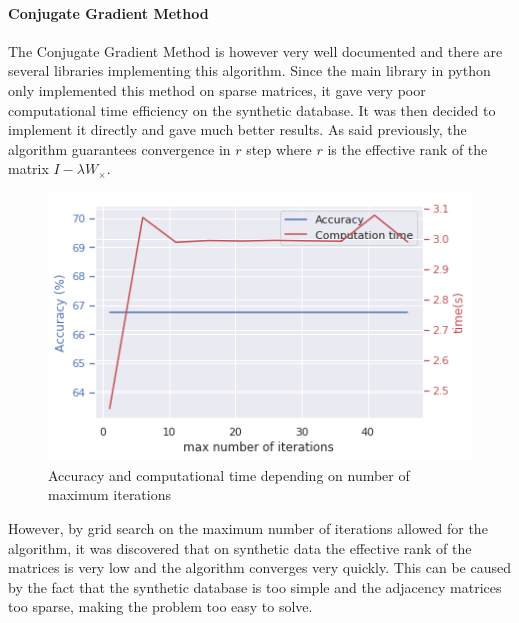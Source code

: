 \documentclass{article}
\theoremstyle{definition}
\begin{document}
\paragraph{Conjugate Gradient Method}
The Conjugate Gradient Method is however very well documented\cite{nesterov_lectures_2018} and there are several libraries implementing this algorithm. Since the main library in python\cite{jones2016scipy} only implemented this method on sparse matrices, it gave very poor computational time efficiency on the synthetic database. It was then decided to implement it directly and gave much better results. As said previously, the algorithm guarantees convergence in $r$ step where $r$ is the effective rank of the matrix $I-\lambda W_\times$. 
\begin{figure}[!htb]
	\centering
	\includegraphics[width=0.7\linewidth]{data/conj_grad/acc_time_fct_iter.png}
	\caption{Accuracy and computational time depending on number of maximum iterations}
\end{figure}
However, by grid search on the maximum number of iterations allowed for the algorithm, it was discovered that on synthetic data the effective rank of the matrices is very low and the algorithm converges very quickly. This can be caused by the fact that the synthetic database is too simple and the adjacency matrices too sparse, making the problem too easy to solve.
\end{document}
